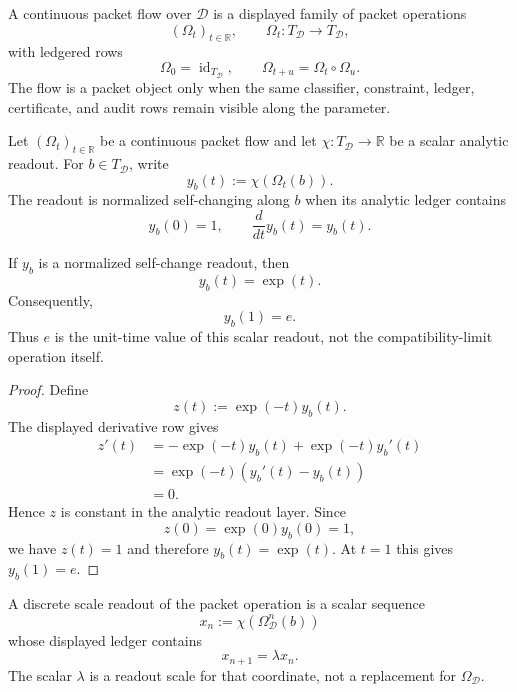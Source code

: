 \begin{definition}
\label{def:continuous-packet-flow}
A continuous packet flow over $\mathcal D$ is a displayed family of packet
operations
$$
(\Omega_t)_{t\in\mathbb R},
\qquad
\Omega_t:T_{\mathcal D}\to T_{\mathcal D},
$$
with ledgered rows
$$
\Omega_0=\operatorname{id}_{T_{\mathcal D}},
\qquad
\Omega_{t+u}=\Omega_t\circ\Omega_u.
$$
The flow is a packet object only when the same classifier, constraint,
ledger, certificate, and audit rows remain visible along the parameter.
\end{definition}

\begin{definition}
\label{def:normalized-self-change-readout}
Let $(\Omega_t)_{t\in\mathbb R}$ be a continuous packet flow and let
$\chi:T_{\mathcal D}\to\mathbb R$ be a scalar analytic readout. For
$b\in T_{\mathcal D}$, write
$$
y_b(t):=\chi(\Omega_t(b)).
$$
The readout is normalized self-changing along $b$ when its analytic ledger
contains
$$
y_b(0)=1,
\qquad
\frac{d}{dt}y_b(t)=y_b(t).
$$
\end{definition}

\begin{theorem}
\label{thm:exponential-readout-shadow}
If $y_b$ is a normalized self-change readout, then
$$
y_b(t)=\exp(t).
$$
Consequently,
$$
y_b(1)=e.
$$
Thus $e$ is the unit-time value of this scalar readout, not the
compatibility-limit operation itself.
\end{theorem}

\begin{proof}
Define
$$
z(t):=\exp(-t)y_b(t).
$$
The displayed derivative row gives
$$
\begin{aligned}
z'(t)
&=
-\exp(-t)y_b(t)+\exp(-t)y_b'(t)\\
&=
\exp(-t)(y_b'(t)-y_b(t))\\
&=
0.
\end{aligned}
$$
Hence $z$ is constant in the analytic readout layer. Since
$$
z(0)=\exp(0)y_b(0)=1,
$$
we have $z(t)=1$ and therefore $y_b(t)=\exp(t)$. At $t=1$ this gives
$y_b(1)=e$.
\end{proof}

\begin{definition}
\label{def:discrete-scale-readout}
A discrete scale readout of the packet operation is a scalar sequence
$$
x_n:=\chi(\Omega_{\mathcal D}^n(b))
$$
whose displayed ledger contains
$$
x_{n+1}=\lambda x_n.
$$
The scalar $\lambda$ is a readout scale for that coordinate, not a
replacement for $\Omega_{\mathcal D}$.
\end{definition}

